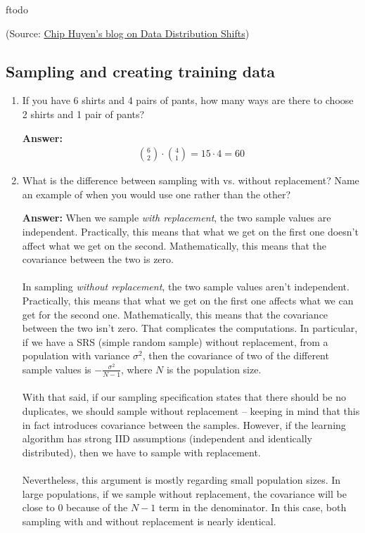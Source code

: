 ƒtodo\documentclass{article}
\newenvironment{QandA}{\begin{enumerate}[label=\arabic*.]}{\end{enumerate}}
\newenvironment{InnerQandA}{\begin{enumerate}[label=\roman*.]}{\end{enumerate}}
\newenvironment{answer}{\par\normalfont \textbf{Answer:}}{}
\begin{document}
\begin{QandA}
\begin{InnerQandA}
    (Source: \href{https://huyenchip.com/2022/02/07/data-distribution-shifts-and-monitoring.html}{Chip Huyen's blog on Data Distribution Shifts})
    \end{InnerQandA}
\end{QandA}

\subsection{Sampling and creating training data}
\begin{QandA}
    \item If you have 6 shirts and 4 pairs of pants, how many ways are there to choose 2 shirts and 1 pair of pants?
    \begin{answer}
        \begin{align*}
            {6 \choose 2} \cdot {4 \choose 1} = 15 \cdot 4 = 60
        \end{align*}
    \end{answer}

    \item What is the difference between sampling with vs. without replacement? Name an example of when you would use one rather than the other?
    \begin{answer}
        When we sample \textit{with replacement}, the two sample values are independent. Practically, this means that what we get on the first one doesn't affect what we get on the second. Mathematically, this means that the covariance between the two is zero. \\\\
        In sampling \textit{without replacement}, the two sample values aren't independent. Practically, this means that what we get on the first one affects what we can get for the second one. Mathematically, this means that the covariance between the two isn't zero. That complicates the computations. In particular, if we have a SRS (simple random sample) without replacement, from a population with variance $\sigma^2$, then the covariance of two of the different sample values is $-\frac{\sigma^2}{N-1}$, where $N$ is the population size. \\\\
        With that said, if our sampling specification states that there should be no duplicates, we should sample without replacement -- keeping in mind that this in fact introduces covariance between the samples. However, if the learning algorithm has strong IID assumptions (independent and identically distributed), then we have to sample with replacement. \\\\
        Nevertheless, this argument is mostly regarding small population sizes. In large populations, if we sample without replacement, the covariance will be close to $0$ because of the $N-1$ term in the denominator. In this case, both sampling with and without replacement is nearly identical. 


\end{answer}
\end{QandA}
\end{document}
